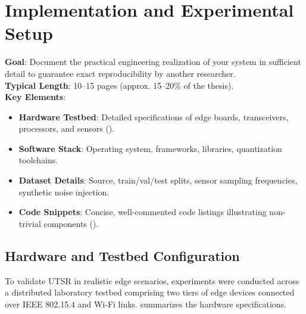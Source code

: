 
\chapter{Implementation and Experimental Setup}
\label{ch:implementation}

\begin{takeawaybox}
\textbf{Goal}: Document the practical engineering realization of your system in sufficient detail to guarantee exact reproducibility by another researcher.\\
\textbf{Typical Length}: 10--15 pages (approx. 15--20\% of the thesis).\\
\textbf{Key Elements}:
\begin{itemize}[leftmargin=*]
    \item \textbf{Hardware Testbed}: Detailed specifications of edge boards, transceivers, processors, and sensors ().
    \item \textbf{Software Stack}: Operating system, frameworks, libraries, quantization toolchains.
    \item \textbf{Dataset Details}: Source, train/val/test splits, sensor sampling frequencies, synthetic noise injection.
    \item \textbf{Code Snippets}: Concise, well-commented code listings illustrating non-trivial components ().
\end{itemize}
\end{takeawaybox}

\section{Hardware and Testbed Configuration}
\label{sec:impl_hardware}

To validate \ac{UTSR} in realistic edge scenarios, experiments were conducted across a distributed laboratory testbed comprising two tiers of edge devices connected over IEEE 802.15.4 and Wi-Fi links.  summarizes the hardware specifications.

